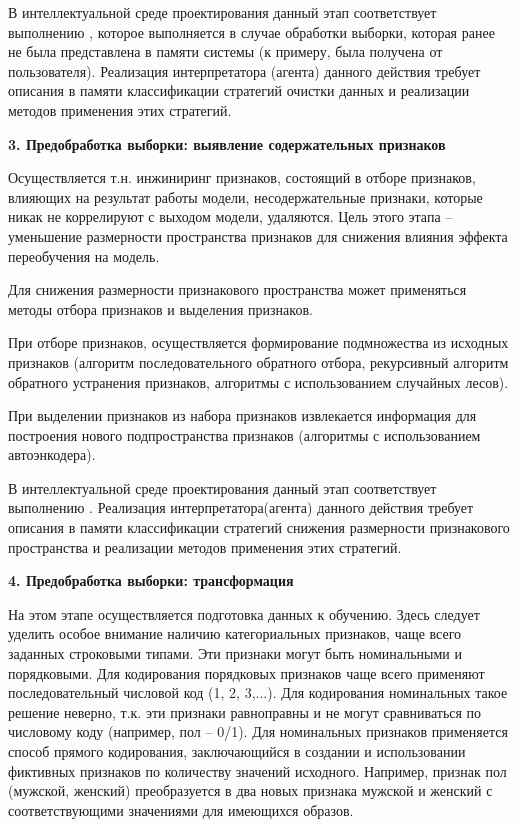 В интеллектуальной среде проектирования данный этап соответствует выполнению , которое выполняется в случае обработки выборки, которая ранее не была представлена в памяти системы (к примеру, была получена от пользователя).
Реализация интерпретатора (агента) данного действия требует описания в памяти классификации стратегий очистки данных и реализации методов применения этих стратегий.


\textbf{3. Предобработка выборки: выявление содержательных признаков}

Осуществляется т.н. инжиниринг признаков, состоящий в отборе признаков, влияющих на результат работы модели, несодержательные признаки, которые никак не коррелируют с выходом модели, удаляются. Цель этого этапа -- уменьшение размерности пространства признаков для снижения влияния эффекта переобучения на модель.

Для снижения размерности признакового пространства может применяться методы отбора признаков и выделения признаков.

При отборе признаков, осуществляется формирование подмножества из исходных признаков (алгоритм последовательного обратного отбора, рекурсивный алгоритм обратного устранения признаков,  алгоритмы с использованием случайных лесов).

При выделении признаков из набора признаков извлекается информация для построения нового подпространства признаков (алгоритмы с использованием автоэнкодера).

В интеллектуальной среде проектирования данный этап соответствует выполнению . Реализация интерпретатора(агента) данного действия требует описания в памяти классификации стратегий снижения размерности признакового пространства и реализации методов применения этих стратегий.


\textbf{4. Предобработка выборки: трансформация}

На этом этапе осуществляется подготовка данных к обучению.
Здесь следует уделить особое внимание наличию категориальных признаков, чаще всего заданных строковыми типами. Эти признаки могут быть номинальными и порядковыми. Для кодирования порядковых признаков чаще всего применяют последовательный числовой код (1, 2, 3,...). Для кодирования номинальных такое решение неверно, т.к. эти признаки равноправны и не могут сравниваться по числовому коду (например, пол -- 0/1). Для номинальных признаков применяется способ прямого кодирования, заключающийся в создании и использовании фиктивных признаков по количеству значений исходного. Например, признак пол (мужской, женский) преобразуется в два новых признака мужской и женский с соответствующими значениями для имеющихся образов.

